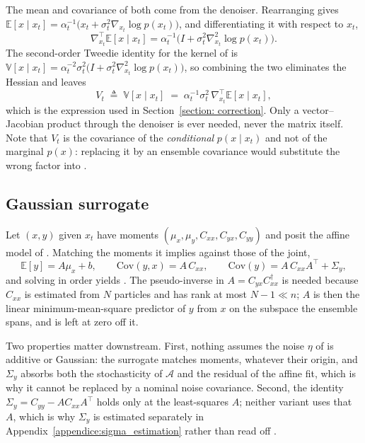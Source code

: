 The mean and covariance of  both come from the denoiser. Rearranging
 gives
$\mathbb{E}[x \mid x_t] = \alpha_t^{-1}\bigl(x_t + \sigma_t^2 \nabla_{\!x_t}\log p(x_t)\bigr)$,
and differentiating it with respect to $x_t$,
\begin{equation} \label{eq:vt_derivation}
    \nabla_{\!x_t}^{\top}\mathbb{E}[x \mid x_t]
    = \alpha_t^{-1}\bigl(I + \sigma_t^{2}\nabla^{2}_{\!x_t}\log p(x_t)\bigr) .
\end{equation}
The second-order Tweedie identity for the kernel of  is
$\mathbb{V}[x \mid x_t] = \alpha_t^{-2}\sigma_t^{2}\bigl(I + \sigma_t^{2}\nabla^{2}_{\!x_t}\log p(x_t)\bigr)$,
so combining the two eliminates the Hessian and leaves
\begin{equation} \label{eq:vt}
    V_t \;\triangleq\; \mathbb{V}[x \mid x_t] \;=\; \alpha_t^{-1}\sigma_t^{2}\,
    \nabla_{\!x_t}^{\top}\mathbb{E}[x \mid x_t] ,
\end{equation}
which is the expression used in Section~\ref{section: correction}. Only a
vector--Jacobian product through the denoiser is ever needed, never the matrix itself. Note that
$V_t$ is the covariance of the \emph{conditional} $p(x \mid x_t)$ and not of the marginal
$p(x)$: replacing it by an ensemble covariance would substitute the wrong factor into
.

\subsection{Gaussian surrogate} \label{appendice:surrogate}

Let $(x,y)$ given $x_t$ have moments $(\mu_x, \mu_y, C_{xx}, C_{yx}, C_{yy})$ and posit the
affine model of . Matching the moments it implies against those
of the joint,
\begin{equation} \label{eq:moment_match}
    \mathbb{E}[y] = A\mu_x + b, \qquad
    \mathrm{Cov}(y,x) = A\,C_{xx}, \qquad
    \mathrm{Cov}(y) = A\,C_{xx}A^{\top} + \Sigma_y ,
\end{equation}
and solving in order yields . The pseudo-inverse in $A = C_{yx}C_{xx}^{\dagger}$
is needed because $C_{xx}$ is estimated from $N$ particles and has rank at most $N-1 \ll n$;
$A$ is then the linear minimum-mean-square predictor of $y$ from $x$ on the subspace the
ensemble spans, and is left at zero off it.

Two properties matter downstream. First, nothing assumes the noise $\eta$ of
 is additive or Gaussian: the surrogate matches moments, whatever their
origin, and $\Sigma_y$ absorbs both the stochasticity of $\mathcal{A}$ and the residual of the
affine fit, which is why it cannot be replaced by a nominal noise covariance. Second, the
identity $\Sigma_y = C_{yy} - AC_{xx}A^{\top}$ holds only at the least-squares $A$; neither
variant uses that $A$, which is why $\Sigma_y$ is estimated separately in
Appendix~\ref{appendice:sigma_estimation} rather than read off .


